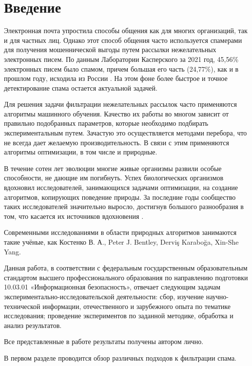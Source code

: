 \chapter*{Введение}

Электронная почта упростила способы общения как для многих организаций, так и для
частных лиц. Однако этот способ общения часто используется спамерами для получения
мошеннической выгоды путем рассылки нежелательных электронных писем. \cite{IEEE}
По данным Лаборатории Касперского за 2021 год, 45,56\% электронных писем было спамом, 
причем большая его часть (24,77\%), как и в прошлом году, исходила из России \cite{stat}. На этом фоне
более быстрое и точное детектирование спама остается актуальной задачей.

Для решения задачи фильтрации нежелательных рассылок часто применяются
алгоритмы машинного обучения. Качество их работы во многом зависит от правильно
подобранных параметров, которые необходимо подбирать экспериментальным путем.
Зачастую это осуществляется методами перебора, что не всегда дает желаемую
производительность. В связи с этим применяются алгоритмы оптимизации, в том числе
и природные.

В течение сотен лет эволюции многие живые организмы развили особые способности,
не дающие им погибнуть. Успех биологических организмов вдохновил исследователей,
занимающихся задачами оптимизации, на создание алгоритмов,
копирующих поведение природы. За последние годы сообщество таких исследователей
значительно выросло, достигнув большого разнообразия в том, что касается их
источников вдохновения \cite{BioInspiredTaxonomy}.

Современными исследованиями в области природных алгоритмов занимаются такие учёные, как Костенко В. А., 
Peter J. Bentley, Derviş Karaboğa, Xin-She Yang.

Данная работа, в соответствии с федеральным государственным образовательным стандартом высшего профессионального
образования по направлению подготовки 10.03.01 «Информационная безопасность», отвечает следующим задачам
экспериментально-исследовательской деятельности: сбор, изучение научно-технической информации, отечественного и
зарубежного опыта по тематике исследования; проведение экспериментов по заданной методике, обработка и анализ результатов.

Все представленные в работе результаты получены автором лично.

В первом разделе проводится обзор различных подходов к фильтрации спама.

